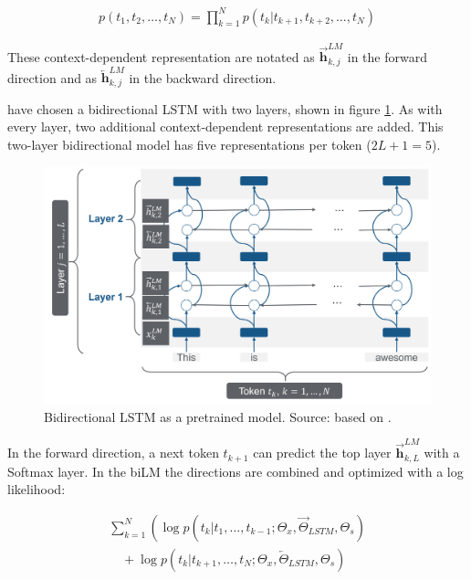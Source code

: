 \documentclass[]{krantz}
\begin{document}
\[
\begin{aligned}
p\left(t_{1}, t_{2}, \ldots, t_{N}\right)=\prod_{k=1}^{N} p\left(t_{k} | t_{k+1}, t_{k+2}, \ldots, t_{N}\right)
\end{aligned}
\]

These context-dependent representation are notated as \(\overrightarrow{\mathbf{h}}_{k, j}^{L M}\) in the forward direction and as \(\overleftarrow{\mathbf{h}}_{k, j}^{L M}\) in the backward direction.

\citet{peter2018} have chosen a bidirectional LSTM with two layers, shown in figure \ref{fig:ch21-elmo-pretrained2}. As with every layer, two additional context-dependent representations are added. This two-layer bidirectional model has five representations per token (\(2L+1 = 5\)).



\begin{figure}

{\centering \includegraphics[width=0.9\linewidth]{figures/02-01-transfer-learning-for-nlp-1/elmo-pretrained-bilm-2} 

}

\caption{Bidirectional LSTM as a pretrained model. Source: based on \citet{peter2018}.}\label{fig:ch21-elmo-pretrained2}
\end{figure}

In the forward direction, a next token \(t_{k+1}\) can predict the top layer \(\overrightarrow{\mathbf{h}}_{k, L}^{L M}\) with a Softmax layer. In the biLM the directions are combined and optimized with a log likelihood:

\[\begin{array}{l}
\sum_{k=1}^{N}\left(\log p\left(t_{k} | t_{1}, \ldots, t_{k-1} ; \Theta_{x}, \vec{\Theta}_{L S T M}, \Theta_{s}\right)\right. \\
\quad+\log p\left(t_{k} | t_{k+1}, \ldots, t_{N} ; \Theta_{x}, \overleftarrow{\Theta}_{L S T M}, \Theta_{s}\right)
\end{array}\]
\end{document}
